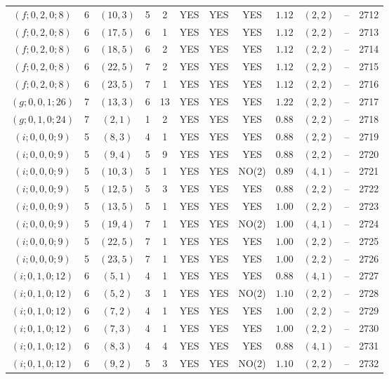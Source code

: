 \begin{longtable}{|c|c|c|c|c|c|c|c|c|c|c|c|}
$(f;0,2,0;8)$ & 6 & $(10,3)$ & 5 & 2 & YES & YES & YES & $1.12$ & $(2,2)$ & -- & 2712\\
$(f;0,2,0;8)$ & 6 & $(17,5)$ & 6 & 1 & YES & YES & YES & $1.12$ & $(2,2)$ & -- & 2713\\
$(f;0,2,0;8)$ & 6 & $(18,5)$ & 6 & 2 & YES & YES & YES & $1.12$ & $(2,2)$ & -- & 2714\\
$(f;0,2,0;8)$ & 6 & $(22,5)$ & 7 & 2 & YES & YES & YES & $1.12$ & $(2,2)$ & -- & 2715\\
$(f;0,2,0;8)$ & 6 & $(23,5)$ & 7 & 1 & YES & YES & YES & $1.12$ & $(2,2)$ & -- & 2716\\
$(g;0,0,1;26)$ & 7 & $(13,3)$ & 6 & 13 & YES & YES & YES & $1.22$ & $(2,2)$ & -- & 2717\\
$(g;0,1,0;24)$ & 7 & $(2,1)$ & 1 & 2 & YES & YES & YES & $0.88$ & $(2,2)$ & -- & 2718\\
$(i;0,0,0;9)$ & 5 & $(8,3)$ & 4 & 1 & YES & YES & YES & $0.88$ & $(2,2)$ & -- & 2719\\
$(i;0,0,0;9)$ & 5 & $(9,4)$ & 5 & 9 & YES & YES & YES & $0.88$ & $(2,2)$ & -- & 2720\\
$(i;0,0,0;9)$ & 5 & $(10,3)$ & 5 & 1 & YES & YES & NO(2) & $0.89$ & $(4,1)$ & -- & 2721\\
$(i;0,0,0;9)$ & 5 & $(12,5)$ & 5 & 3 & YES & YES & YES & $0.88$ & $(2,2)$ & -- & 2722\\
$(i;0,0,0;9)$ & 5 & $(13,5)$ & 5 & 1 & YES & YES & YES & $1.00$ & $(2,2)$ & -- & 2723\\
$(i;0,0,0;9)$ & 5 & $(19,4)$ & 7 & 1 & YES & YES & NO(2) & $1.00$ & $(4,1)$ & -- & 2724\\
$(i;0,0,0;9)$ & 5 & $(22,5)$ & 7 & 1 & YES & YES & YES & $1.00$ & $(2,2)$ & -- & 2725\\
$(i;0,0,0;9)$ & 5 & $(23,5)$ & 7 & 1 & YES & YES & YES & $1.00$ & $(2,2)$ & -- & 2726\\
$(i;0,1,0;12)$ & 6 & $(5,1)$ & 4 & 1 & YES & YES & YES & $0.88$ & $(4,1)$ & -- & 2727\\
$(i;0,1,0;12)$ & 6 & $(5,2)$ & 3 & 1 & YES & YES & NO(2) & $1.10$ & $(2,2)$ & -- & 2728\\
$(i;0,1,0;12)$ & 6 & $(7,2)$ & 4 & 1 & YES & YES & YES & $1.00$ & $(2,2)$ & -- & 2729\\
$(i;0,1,0;12)$ & 6 & $(7,3)$ & 4 & 1 & YES & YES & YES & $1.00$ & $(2,2)$ & -- & 2730\\
$(i;0,1,0;12)$ & 6 & $(8,3)$ & 4 & 4 & YES & YES & YES & $0.88$ & $(4,1)$ & -- & 2731\\
$(i;0,1,0;12)$ & 6 & $(9,2)$ & 5 & 3 & YES & YES & NO(2) & $1.10$ & $(2,2)$ & -- & 2732\\

\end{longtable}
